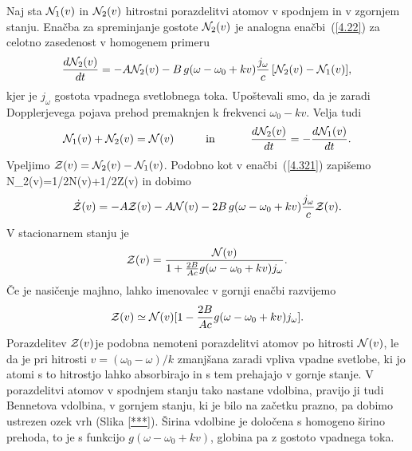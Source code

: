 Naj sta ${\cal N}_{1}(v)$ in ${\cal N}_{2}(v)$ hitrostni porazdelitvi
atomov v spodnjem in v zgornjem stanju. Enačba za spreminjanje gostote
${\cal N}_{2}(v)$ je analogna enačbi~(\ref{4.22}) za celotno
zasedenost v homogenem primeru
\begin{equation}
\frac{d{\cal N}_{2}(v)}{dt}=-A{\cal N}_{2}(v) -B\, g(\omega-\omega_{0}+kv)
\frac{j_{\omega}}{c}\,
[{\cal N}_{2}(v)-{\cal N}_{1}(v)],
\label{4.85}
\end{equation}
 kjer je $j_{\omega}$ gostota vpadnega svetlobnega toka. Upoštevali
smo, da je zaradi Dopplerjevega pojava prehod premaknjen k frekvenci
$\omega_{0}-kv$. Velja tudi
\begin{equation}
{\cal N}_{1}(v)+{\cal N}_{2}(v)={\cal N}(v)\mbox{\hskip1cm in \hskip1cm}\frac{d{\cal N}_{2}(v)}{dt}=-\frac{d{\cal N}_{1}(v)}{dt}.
\label{4.86}
\end{equation}
Vpeljimo ${\cal Z}(v)={\cal N}_{2}(v)-{\cal N}_{1}(v)$. Podobno kot 
v enačbi~(\ref{4.321}) zapišemo
\beq
{\cal N}_{2}(v)=1/2{\cal N}(v)+1/2{\cal Z}(v)
\eeq
in dobimo 
\begin{equation}
\dot{{\cal Z}}(v)=-A{\cal Z}(v)-A{\cal N}(v)
-2B\,g(\omega-\omega_{0}+kv)\frac{j_{\omega}}{c}
{\cal Z}(v).
\label{4.87}
\end{equation}
V stacionarnem stanju je 
\begin{equation}
{\cal Z}(v)=\frac{{\cal N}(v)}{1+\frac{2B}{Ac}g(\omega-\omega_{0}+kv)j_{\omega}}.\label{4.88}
\end{equation}
 Če je nasičenje majhno, lahko imenovalec v gornji enačbi razvijemo
\begin{equation}
{\cal Z}(v)\simeq{\cal N}(v)[1-\frac{2B}{Ac}g(\omega-\omega_{0}+kv)j_{\omega}].\label{4.89}
\end{equation}
 Porazdelitev ${\cal Z}(v)$je podobna nemoteni porazdelitvi atomov
po hitrosti ${\cal N}(v)$, le da je pri hitrosti $v=(\omega_{0}-\omega)/k$
zmanjšana zaradi vpliva vpadne svetlobe, ki jo atomi s to hitrostjo
lahko absorbirajo in s tem prehajajo v gornje stanje. V porazdelitvi
atomov v spodnjem stanju tako nastane vdolbina, pravijo ji tudi Bennetova
vdolbina, v gornjem stanju, ki je bilo na začetku prazno, pa dobimo
ustrezen ozek vrh (Slika \ref{***}). Širina vdolbine je določena
s homogeno širino prehoda, to je s funkcijo $g(\omega-\omega_{0}+kv)$,
globina pa z gostoto vpadnega toka.

